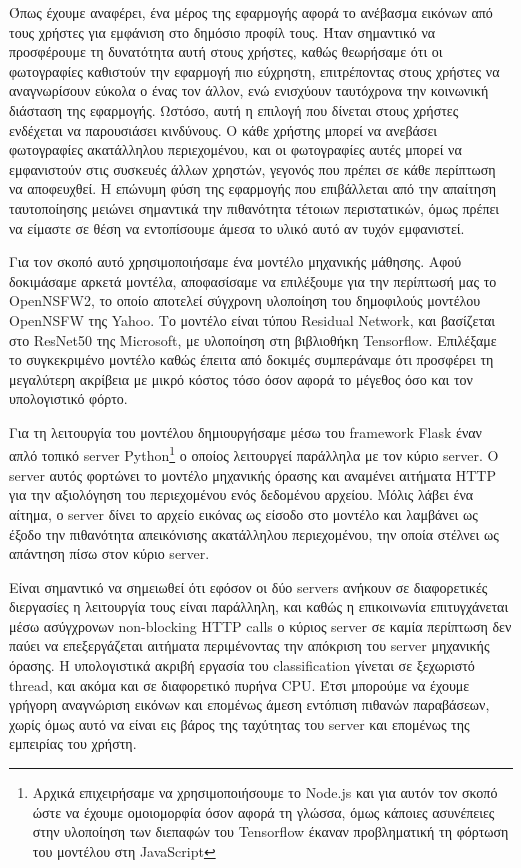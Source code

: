 \documentclass[../thesis.tex]{subfiles}
\begin{document}
Όπως έχουμε αναφέρει, ένα μέρος της εφαρμογής αφορά το ανέβασμα εικόνων από τους χρήστες για εμφάνιση στο δημόσιο προφίλ τους.
Ήταν σημαντικό να προσφέρουμε τη δυνατότητα αυτή στους χρήστες, καθώς θεωρήσαμε ότι οι φωτογραφίες καθιστούν την εφαρμογή πιο εύχρηστη, επιτρέποντας στους χρήστες να αναγνωρίσουν εύκολα ο ένας τον άλλον, ενώ ενισχύουν ταυτόχρονα την κοινωνική διάσταση της εφαρμογής.
Ωστόσο, αυτή η επιλογή που δίνεται στους χρήστες ενδέχεται να παρουσιάσει κινδύνους.
Ο κάθε χρήστης μπορεί να ανεβάσει φωτογραφίες ακατάλληλου περιεχομένου, και οι φωτογραφίες αυτές μπορεί να εμφανιστούν στις συσκευές άλλων χρηστών, γεγονός που πρέπει σε κάθε περίπτωση να αποφευχθεί.
Η επώνυμη φύση της εφαρμογής που επιβάλλεται από την απαίτηση ταυτοποίησης μειώνει σημαντικά την πιθανότητα τέτοιων περιστατικών, όμως πρέπει να είμαστε σε θέση να εντοπίσουμε άμεσα το υλικό αυτό αν τυχόν εμφανιστεί.

\bigskip

Για τον σκοπό αυτό χρησιμοποιήσαμε ένα μοντέλο μηχανικής μάθησης.
Αφού δοκιμάσαμε αρκετά μοντέλα, αποφασίσαμε να επιλέξουμε για την περίπτωσή μας το OpenNSFW2\cite{Yung_Open-NSFW_2_2023}, το οποίο αποτελεί σύγχρονη υλοποίηση του δημοφιλούς μοντέλου OpenNSFW\cite{Mahadeokar_Pesavento_2016} της Yahoo.
Το μοντέλο είναι τύπου Residual Network, και βασίζεται στο ResNet50 της Microsoft, με υλοποίηση στη βιβλιοθήκη Tensorflow.
Επιλέξαμε το συγκεκριμένο μοντέλο καθώς έπειτα από δοκιμές συμπεράναμε ότι προσφέρει τη μεγαλύτερη ακρίβεια με μικρό κόστος τόσο όσον αφορά το μέγεθος όσο και τον υπολογιστικό φόρτο.

\bigskip

Για τη λειτουργία του μοντέλου δημιουργήσαμε μέσω του framework Flask έναν απλό τοπικό server Python\footnote{Αρχικά επιχειρήσαμε να χρησιμοποιήσουμε το Node.js και για αυτόν τον σκοπό ώστε να έχουμε ομοιομορφία όσον αφορά τη γλώσσα, όμως κάποιες ασυνέπειες στην υλοποίηση των διεπαφών του Tensorflow έκαναν προβληματική τη φόρτωση του μοντέλου στη JavaScript} ο οποίος λειτουργεί παράλληλα με τον κύριο server.
Ο server αυτός φορτώνει το μοντέλο μηχανικής όρασης και αναμένει αιτήματα HTTP για την αξιολόγηση του περιεχομένου ενός δεδομένου αρχείου.
Μόλις λάβει ένα αίτημα, ο server δίνει το αρχείο εικόνας ως είσοδο στο μοντέλο και λαμβάνει ως έξοδο την πιθανότητα απεικόνισης ακατάλληλου περιεχομένου, την οποία στέλνει ως απάντηση πίσω στον κύριο server.

Είναι σημαντικό να σημειωθεί ότι εφόσον οι δύο servers ανήκουν σε διαφορετικές διεργασίες η λειτουργία τους είναι παράλληλη, και καθώς η επικοινωνία επιτυγχάνεται μέσω ασύγχρονων non-blocking HTTP calls ο κύριος server σε καμία περίπτωση δεν παύει να επεξεργάζεται αιτήματα περιμένοντας την απόκριση του server μηχανικής όρασης.
Η υπολογιστικά ακριβή εργασία του classification γίνεται σε ξεχωριστό thread, και ακόμα και σε διαφορετικό πυρήνα CPU.
Έτσι μπορούμε να έχουμε γρήγορη αναγνώριση εικόνων και επομένως άμεση εντόπιση πιθανών παραβάσεων, χωρίς όμως αυτό να είναι εις βάρος της ταχύτητας του server και επομένως της εμπειρίας του χρήστη.
\end{document}
